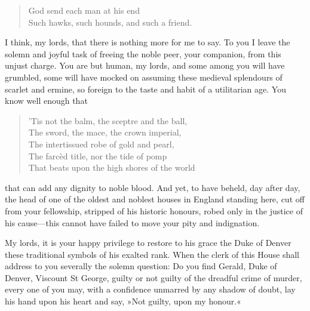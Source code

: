 \begin{dialogue}
\begin{verse}
God send each man at his end\\
Such hawks, such hounds, and such a friend.\\
\end{verse}


I think, my lords, that there is nothing more for me to say. To you I leave the solemn and joyful task of freeing the noble peer, your companion, from this unjust charge. You are but human, my lords, and some among you will have grumbled, some will have mocked on assuming these medieval splendours of scarlet and ermine, so foreign to the taste and habit of a utilitarian age. You know well enough that

\begin{verse}
'Tis not the balm, the sceptre and the ball,\\
The sword, the mace, the crown imperial,\\
The intertissued robe of gold and pearl,\\
The farcèd title, nor the tide of pomp\\
That beats upon the high shores of the world\\
\end{verse}

that can add any dignity to noble blood. And yet, to have beheld, day after day, the head of one of the oldest and noblest houses in England standing here, cut off from your fellowship, stripped of his historic honours, robed only in the justice of his cause—this cannot have failed to move your pity and indignation.

\smallskip

My lords, it is your happy privilege to restore to his grace the Duke of Denver these traditional symbols of his exalted rank. When the clerk of this House shall address to you severally the solemn question: Do you find Gerald, Duke of Denver, Viscount St George, guilty or not guilty of the dreadful crime of murder, every one of you may, with a confidence unmarred by any shadow of doubt, lay his hand upon his heart and say, »Not guilty, upon my honour.«

\end{dialogue}
